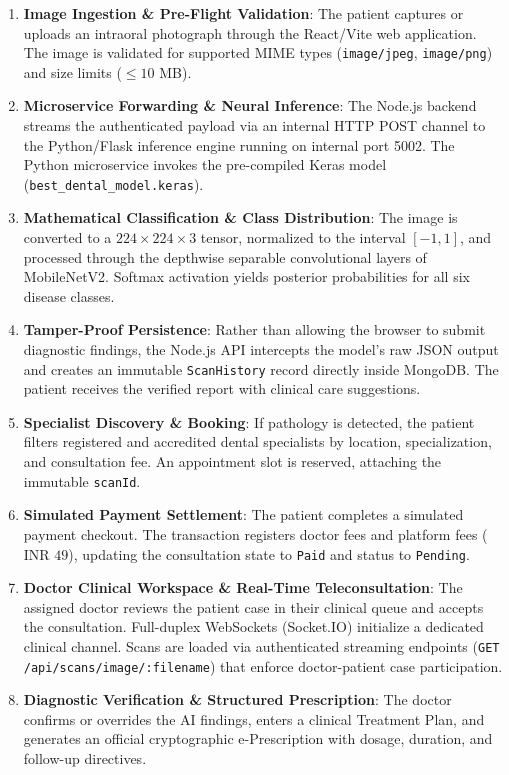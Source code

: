 \documentclass[12pt,a4paper]{report}
\begin{document}
\begin{enumerate}
    \item \textbf{Image Ingestion \& Pre-Flight Validation}:
    The patient captures or uploads an intraoral photograph through the React/Vite web application. The image is validated for supported MIME types (\texttt{image/jpeg}, \texttt{image/png}) and size limits ($\le 10$ MB).
    
    \item \textbf{Microservice Forwarding \& Neural Inference}:
    The Node.js backend streams the authenticated payload via an internal HTTP POST channel to the Python/Flask inference engine running on internal port 5002. The Python microservice invokes the pre-compiled Keras model (\texttt{best\_dental\_model.keras}).
    
    \item \textbf{Mathematical Classification \& Class Distribution}:
    The image is converted to a $224 \times 224 \times 3$ tensor, normalized to the interval $[-1, 1]$, and processed through the depthwise separable convolutional layers of MobileNetV2. Softmax activation yields posterior probabilities for all six disease classes.
    
    \item \textbf{Tamper-Proof Persistence}:
    Rather than allowing the browser to submit diagnostic findings, the Node.js API intercepts the model's raw JSON output and creates an immutable \texttt{ScanHistory} record directly inside MongoDB. The patient receives the verified report with clinical care suggestions.
    
    \item \textbf{Specialist Discovery \& Booking}:
    If pathology is detected, the patient filters registered and accredited dental specialists by location, specialization, and consultation fee. An appointment slot is reserved, attaching the immutable \texttt{scanId}.
    
    \item \textbf{Simulated Payment Settlement}:
    The patient completes a simulated payment checkout. The transaction registers doctor fees and platform fees ($\text{INR } 49$), updating the consultation state to \texttt{Paid} and status to \texttt{Pending}.
    
    \item \textbf{Doctor Clinical Workspace \& Real-Time Teleconsultation}:
    The assigned doctor reviews the patient case in their clinical queue and accepts the consultation. Full-duplex WebSockets (Socket.IO) initialize a dedicated clinical channel. Scans are loaded via authenticated streaming endpoints (\texttt{GET /api/scans/image/:filename}) that enforce doctor-patient case participation.
    
    \item \textbf{Diagnostic Verification \& Structured Prescription}:
    The doctor confirms or overrides the AI findings, enters a clinical Treatment Plan, and generates an official cryptographic e-Prescription with dosage, duration, and follow-up directives.
\end{enumerate}
\end{document}
